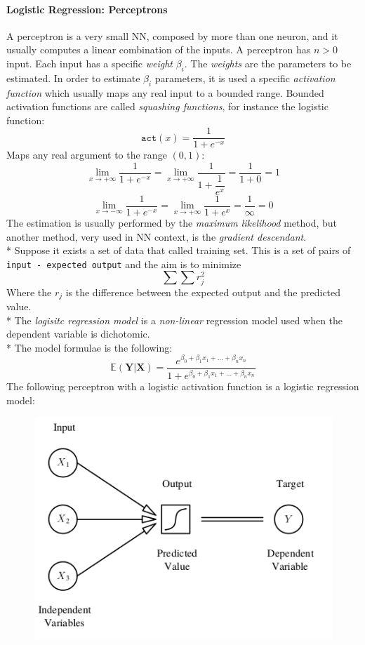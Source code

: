 \documentclass[10pt,a4paper]{article}
\begin{document}
	\paragraph{Logistic Regression: Perceptrons}
	A perceptron is a very small NN, composed by more than one neuron, and it usually computes a linear combination of the inputs.
	A perceptron has $n>0$ input. Each input has a specific \emph{weight} $\beta_i$. The \emph{weights} are the parameters to be estimated. In order to estimate $\beta_i$ parameters, it is used a specific \emph{activation function} which usually maps any real input to a bounded range. Bounded activation functions are called \emph{squashing functions}, for instance the logistic function:
	$$
	\texttt{act}(x) = \dfrac{1}{1+e^{-x}}
	$$
	Maps any real argument to the range $(0,1)$:
	$$
	\lim_{x\rightarrow +\infty} \dfrac{1}{1+e^{-x}} = 	\lim_{x\rightarrow +\infty} \dfrac{1}{1+\dfrac{1}{e^x}} = \dfrac{1}{1+0} = 1
	$$
	$$
	\lim_{x\rightarrow -\infty} \dfrac{1}{1+e^{-x}} = 	\lim_{x\rightarrow +\infty} \dfrac{1}{1+{e^x}} = \dfrac{1}{\infty} = 0
	$$
	The estimation is usually performed by the \emph{maximum likelihood} method, but another method, very used in NN context, is the \emph{gradient descendant}.\\*
	Suppose it exists a set of data that called training set. This is a set of pairs of  \texttt{input - expected output} and the aim is to minimize
	$$
	\sum \sum r_j^2
	$$
	Where the $r_j$ is the difference between the expected output and the predicted value.\\*
	The \emph{logisitc regression model} is a \emph{non-linear} regression model used when the dependent variable is dichotomic.\\*
	The model formulae is the following:
	$$
	\mathbb{E}(\textbf{Y}|\textbf{X}) = \dfrac{e^{\beta_0 + \beta_1x_1+\dots+\beta_n x_n}}{1 +e^{\beta_0 + \beta_1x_1+\dots+\beta_n x_n} }
	$$
	The following perceptron with a logistic activation function is a logistic regression model:
		\begin{figure}[h!]
		\centering
		\includegraphics[scale=1.4]{img/logreg}
	\end{figure}
\end{document}
